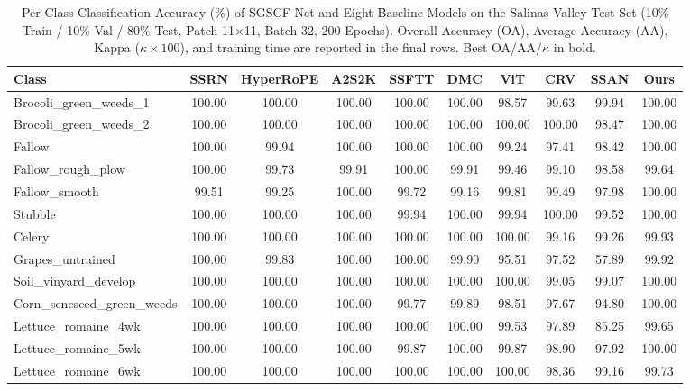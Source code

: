 \documentclass[manuscript,screen,review]{acmart}
\begin{document}
\begin{table}[tbp]
\centering
\scriptsize
\setlength{\tabcolsep}{3.5pt}
\caption{Per-Class Classification Accuracy (\%) of SGSCF-Net and Eight Baseline Models on the Salinas Valley Test Set (10\% Train / 10\% Val / 80\% Test, Patch 11$\times$11, Batch 32, 200 Epochs). Overall Accuracy (OA), Average Accuracy (AA), Kappa ($\kappa \times 100$), and training time are reported in the final rows. Best OA/AA/$\kappa$ in bold.}
\label{tab:perclass_sv}
\begin{tabular}{p{2.9cm}ccccccccc}
\toprule
\textbf{Class} & \textbf{SSRN} & \textbf{HyperRoPE} & \textbf{A2S2K} & \textbf{SSFTT} & \textbf{DMC} & \textbf{ViT} & \textbf{CRV} & \textbf{SSAN} & \textbf{Ours} \\
\midrule
Brocoli\_green\_weeds\_1   & 100.00 & 100.00 & 100.00 & 100.00 & 100.00 & 98.57 & 99.63 & 99.94 & 100.00 \\
Brocoli\_green\_weeds\_2   & 100.00 & 100.00 & 100.00 & 100.00 & 100.00 & 100.00 & 100.00 & 98.47 & 100.00 \\
Fallow                     & 100.00 & 99.94 & 100.00 & 100.00 & 100.00 & 99.24 & 97.41 & 98.42 & 100.00 \\
Fallow\_rough\_plow        & 100.00 & 99.73 & 99.91 & 100.00 & 99.91 & 99.46 & 99.10 & 98.58 & 99.64 \\
Fallow\_smooth             & 99.51 & 99.25 & 100.00 & 99.72 & 99.16 & 99.81 & 99.49 & 97.98 & 100.00 \\
Stubble                    & 100.00 & 100.00 & 100.00 & 99.94 & 100.00 & 99.94 & 100.00 & 99.52 & 100.00 \\
Celery                     & 100.00 & 100.00 & 100.00 & 100.00 & 100.00 & 100.00 & 99.16 & 99.26 & 99.93 \\
Grapes\_untrained          & 100.00 & 99.83 & 100.00 & 100.00 & 99.90 & 95.51 & 97.52 & 57.89 & 99.92 \\
Soil\_vinyard\_develop     & 100.00 & 100.00 & 100.00 & 100.00 & 100.00 & 100.00 & 99.05 & 99.07 & 100.00 \\
Corn\_senesced\_green\_weeds & 100.00 & 100.00 & 100.00 & 99.77 & 99.89 & 98.51 & 97.67 & 94.80 & 100.00 \\
Lettuce\_romaine\_4wk      & 100.00 & 100.00 & 100.00 & 100.00 & 100.00 & 99.53 & 97.89 & 85.25 & 99.65 \\
Lettuce\_romaine\_5wk      & 100.00 & 100.00 & 100.00 & 99.87 & 100.00 & 99.87 & 98.90 & 97.92 & 100.00 \\
Lettuce\_romaine\_6wk      & 100.00 & 100.00 & 100.00 & 100.00 & 100.00 & 100.00 & 98.36 & 99.16 & 99.73 \\

\end{tabular}
\end{table}
\end{document}
